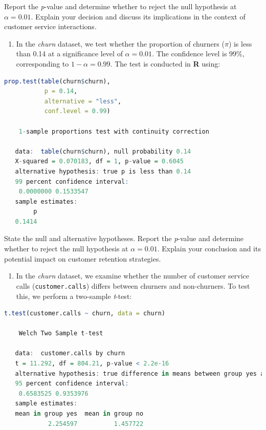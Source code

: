 \documentclass[
]{book}
\newcommand{\passthrough}[1]{#1}
\providecommand{\tightlist}{%
  \setlength{\itemsep}{0pt}\setlength{\parskip}{0pt}}
\theoremstyle{definition}
\theoremstyle{definition}
\theoremstyle{definition}
\theoremstyle{definition}
\theoremstyle{remark}
\begin{document}
Report the \emph{p}-value and determine whether to reject the null hypothesis at \(\alpha=0.01\). Explain your decision and discuss its implications in the context of customer service interactions.

\begin{enumerate}
\def\labelenumi{\arabic{enumi}.}
\setcounter{enumi}{12}
\tightlist
\item
  In the \emph{churn} dataset, we test whether the proportion of churners (\(\pi\)) is less than 0.14 at a significance level of \(\alpha=0.01\). The confidence level is \(99\%\), corresponding to \(1-\alpha = 0.99\). The test is conducted in \textbf{R} using:
\end{enumerate}

\begin{lstlisting}[language=R]
prop.test(table(churn$churn), 
           p = 0.14, 
           alternative = "less", 
           conf.level = 0.99)
   
    1-sample proportions test with continuity correction
   
   data:  table(churn$churn), null probability 0.14
   X-squared = 0.070183, df = 1, p-value = 0.6045
   alternative hypothesis: true p is less than 0.14
   99 percent confidence interval:
    0.0000000 0.1533547
   sample estimates:
        p 
   0.1414
\end{lstlisting}

State the null and alternative hypotheses. Report the \emph{p}-value and determine whether to reject the null hypothesis at \(\alpha=0.01\). Explain your conclusion and its potential impact on customer retention strategies.

\begin{enumerate}
\def\labelenumi{\arabic{enumi}.}
\setcounter{enumi}{13}
\tightlist
\item
  In the \emph{churn} dataset, we examine whether the number of customer service calls (\passthrough{\lstinline!customer.calls!}) differs between churners and non-churners. To test this, we perform a two-sample \emph{t}-test:
\end{enumerate}

\begin{lstlisting}[language=R]
t.test(customer.calls ~ churn, data = churn)
   
    Welch Two Sample t-test
   
   data:  customer.calls by churn
   t = 11.292, df = 804.21, p-value < 2.2e-16
   alternative hypothesis: true difference in means between group yes and group no is not equal to 0
   95 percent confidence interval:
    0.6583525 0.9353976
   sample estimates:
   mean in group yes  mean in group no 
            2.254597          1.457722
\end{lstlisting}
\end{document}
